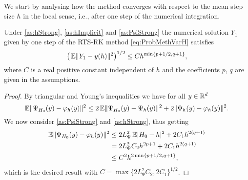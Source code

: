 \documentclass[10pt]{article}
\begin{document}
We start by analysing how the method converges with respect to the mean step size $h$ in the local sense, i.e., after one step of the numerical integration.
\begin{lemma}\label{thm:StrongOrderLocal} Under \cref{as:hStrong}, \cref{as:hImplicit} and \cref{as:PsiStrong} the numerical solution $Y_1$ given by one step of the RTS-RK method \eqref{eq:ProbMethVarH} satisfies 
	\begin{equation}
		\big(\operatorname{\mathbb{E}}\lVert Y_1 - y(h)\rVert^2\big)^{1/2} \leq C h^{\min\{p+1/2, q + 1\}},
	\end{equation}
	where $C$ is a real positive constant independent of $h$ and the coefficients $p$, $q$ are given in the assumptions.
\end{lemma}
\begin{proof} By triangular and Young's inequalities we have for all $y \in \mathbb{R}^d$ 
	\begin{equation}
		\operatorname{\mathbb{E}}\lVert\Psi_{H_0}(y) - \varphi_h(y)\rVert^2 \leq 2\operatorname{\mathbb{E}}\lVert\Psi_{H_0}(y) - \Psi_h(y)\rVert^2 + 2\lVert\Psi_h(y) - \varphi_h(y)\rVert^2.
	\end{equation}		
	We now consider \cref{as:PsiStrong} and \cref{as:hStrong}, thus getting
	\begin{equation}\label{eq:LocalErrorDecomposition}
	\begin{aligned}
		\operatorname{\mathbb{E}}\lVert\Psi_{H_0}(y) - \varphi_h(y)\rVert^2 &\leq 2L_{\Psi}^2 \operatorname{\mathbb{E}}\lvert H_0 - h\rvert^2 + 2C_1 h^{2(q+1)} \\
		&= 2L_{\Psi}^2 C_2 h^{2p+1} + 2 C_1 h^{2(q+1)} \\
		&\leq C^2 h^{2\min\{p+1/2,q+1\}},
	\end{aligned}
	\end{equation}
	which is the desired result with $C = \max\{2L_{\Psi}^2 C_2, 2 C_1\}^{1/2}$.
\end{proof}
\end{document}
